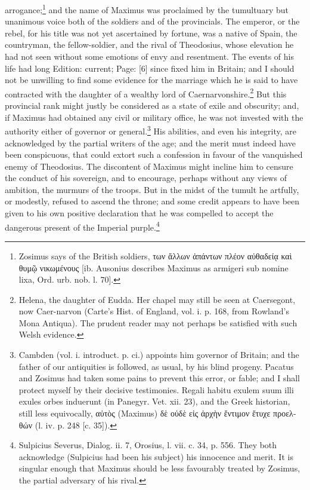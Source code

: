 arrogance;\footnote{Zosimus says of the British soldiers, \textgreek{των \texthebrew{ἄ}λλων \texthebrew{ἁ}πάντων πλέον α\texthebrew{ὐ}θαδεί\texthebrew{ᾳ} κα\texthebrew{ὶ} θυμ\texthebrew{ῷ} νικωμένους} [ib. Ausonius describes Maximus as armigeri sub nomine lixa, Ord. urb. nob. l. 70].} and the name of Maximus was proclaimed by the tumultuary but unanimous voice both of the soldiers and of the provincials. The emperor, or the rebel, for his title was not yet ascertained by fortune, was a native of Spain, the countryman, the fellow-soldier, and the rival of Theodosius, whose elevation he had not seen without some emotions of envy and resentment. The events of his life had long Edition: current; Page: [6] since fixed him in Britain; and I should not be unwilling to find some evidence for the marriage which he is said to have contracted with the daughter of a wealthy lord of Caernarvonshire.\footnote{Helena, the daughter of Eudda. Her chapel may still be seen at Caersegont, now Caer-narvon (Carte\texthebrew{}’s Hist. of England, vol. i. p. 168, from Rowland\texthebrew{}’s Mona Antiqua). The prudent reader may not perhaps be satisfied with such Welsh evidence.} But this provincial rank might justly be considered as a state of exile and obscurity; and, if Maximus had obtained any civil or military office, he was not invested with the authority either of governor or general.\footnote{Cambden (vol. i. introduct. p. ci.) appoints him governor of Britain; and the father of our antiquities is followed, as usual, by his blind progeny. Pacatus and Zosimus had taken some pains to prevent this error, or fable; and I shall protect myself by their decisive testimonies. Regali habitu exulem suum illi exules orbes induerunt (in Panegyr. Vet. xii. 23), and the Greek historian, still less equivocally, \textgreek{α\texthebrew{ὐ}τ\texthebrew{ὸ}ς} (Maximus) \textgreek{δ\texthebrew{ὲ} ο\texthebrew{ὐ}δ\texthebrew{ὲ} ε\texthebrew{ἰ}ς \texthebrew{ἀ}ρχ\texthebrew{ὴ}ν \texthebrew{ἔ}ντιμον \texthebrew{ἔ}τυχε προελθών} (l. iv. p. 248 [c. 35]).} His abilities, and even his integrity, are acknowledged by the partial writers of the age; and the merit must indeed have been conspicuous, that could extort such a confession in favour of the vanquished enemy of Theodosius. The discontent of Maximus might incline him to censure the conduct of his sovereign, and to encourage, perhaps without any views of ambition, the murmurs of the troops. But in the midst of the tumult he artfully, or modestly, refused to ascend the throne; and some credit appears to have been given to his own positive declaration that he was compelled to accept the dangerous present of the Imperial purple.\footnote{Sulpicius Severus, Dialog. ii. 7, Orosius, l. vii. c. 34, p. 556. They both acknowledge (Sulpicius had been his subject) his innocence and merit. It is singular enough that Maximus should be less favourably treated by Zosimus, the partial adversary of his rival.}

